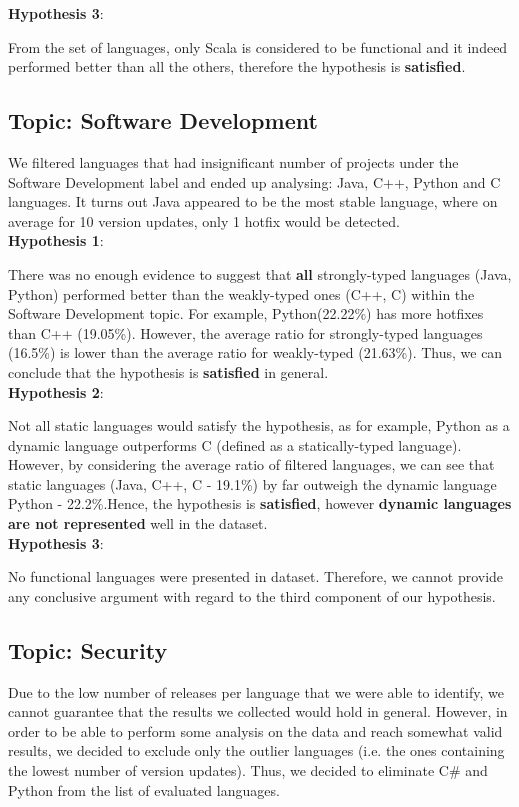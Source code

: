 \textbf{Hypothesis 3}:\par
From the set of languages, only Scala is considered to be functional and it indeed performed better than all the others, therefore the hypothesis is \textbf{satisfied}.

\subsection{Topic: Software Development}
We filtered languages that had insignificant number of projects under the Software Development label and ended up analysing: Java, C++, Python and C languages. It turns out Java appeared to be the most stable language, where on average for 10 version updates, only 1 hotfix would be detected.\\

\textbf{Hypothesis 1}:\par
There was no enough evidence to suggest that \textbf{all} strongly-typed languages (Java, Python) performed better than the weakly-typed ones (C++, C) within the Software Development topic. For example, Python(22.22\%) has more hotfixes than C++ (19.05\%). However, the average ratio for strongly-typed languages (16.5\%) is lower than the average ratio for weakly-typed (21.63\%). Thus, we can conclude that the hypothesis is \textbf{satisfied} in general.\\

\textbf{Hypothesis 2}:\par
Not all static languages would satisfy the hypothesis, as for example, Python as a dynamic language outperforms C (defined as a statically-typed language). However, by considering the average ratio of filtered languages, we can see that static languages (Java, C++, C - 19.1\%) by far outweigh the dynamic language Python - 22.2\%.Hence, the hypothesis is \textbf{satisfied}, however \textbf{dynamic languages are not represented} well in the dataset.\\

\textbf{Hypothesis 3}:\par
No functional languages were presented in dataset. Therefore, we cannot provide any conclusive argument with regard to the third component of our hypothesis.

\subsection{Topic: Security}
Due to the low number of releases per language that we were able to identify, we cannot guarantee that the results we collected would hold in general. However, in order to be able to perform some analysis on the data and reach somewhat valid results, we decided to exclude only the outlier languages  (i.e. the ones containing the lowest number of version updates). Thus, we decided to eliminate C\# and Python from the list of evaluated languages.\par

